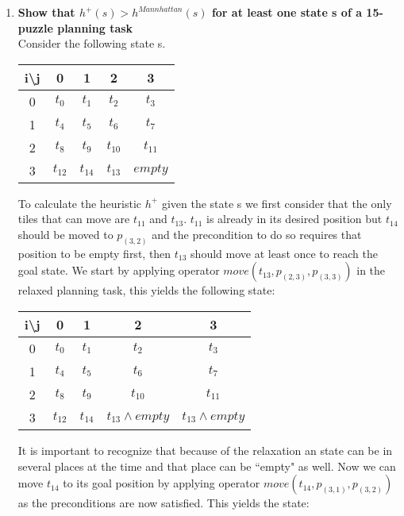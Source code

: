 \documentclass[12pt,a4paper]{article}
\begin{document}
\begin{enumerate}[label=(\alph*), listparindent=1.5em]
		\item \textbf{Show that $h^+(s) > h^{Mannhattan}(s)$ for 
		at least one state s of a 15-puzzle planning task}\\
		Consider the following state s.
		\begin{center}
			\begin{tabular}{c||c|c|c|c|}
				 i\textbackslash j & 0 & 1 & 2 & 3\\
				\hline\hline
				0 & $t_0$ & $t_1$ & $t_2$ & $t_3$ \\
				\hline
				1 & $t_4$ & $t_5$ & $t_6$ & $t_7$ \\
				\hline
				2 & $t_8$ & $t_9$ & $t_{10}$ & $t_{11}$ \\
				\hline
				3 & $t_{12}$ & $t_{14}$ & $t_{13}$ & $empty$ \\
				\hline
			\end{tabular}
		\end{center}
		To calculate the heuristic $h^+$ given 
		the state s we first consider that
		the only tiles that can move are $t_{11}$ and $t_{13}$.
		$t_{11}$ is already in its desired position but
		$t_{14}$ should be moved to $p_{(3,2)}$ and
		the precondition to do so requires that position to
		be empty first, then $t_{13}$ should move at least once
		to reach the goal state. We start by applying
		operator $move(t_{13}, p_{(2,3)}, p_{(3,3)})$ in the relaxed
		planning task, this yields the following state:

		\begin{center}
			\begin{tabular}{c||c|c|c|c|}
				 i\textbackslash j & 0 & 1 & 2 & 3\\
				\hline\hline
				0 & $t_0$ & $t_1$ & $t_2$ & $t_3$ \\
				\hline
				1 & $t_4$ & $t_5$ & $t_6$ & $t_7$ \\
				\hline
				2 & $t_8$ & $t_9$ & $t_{10}$ & $t_{11}$ \\
				\hline
				3 & $t_{12}$ & $t_{14}$ & $t_{13} \land empty $ &  $t_{13} \land empty $ \\
				\hline
			\end{tabular}
		\end{center}

		It is important to recognize that 
		because of the relaxation an state can be in several places
		at the time and that place can be ``empty" as well.
		Now we can move $t_{14}$ to its goal position by 
		applying operator $move(t_{14}, p_{(3,1)}, p_{(3,2)})$
		as the preconditions are now satisfied. This yields the state:
		

\end{enumerate}
\end{document}
